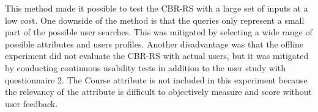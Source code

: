 This method made it possible to test the CBR-RS with a large set of inputs at a low cost. One downside of the method is that the queries only represent a small part of the possible user searches. This was mitigated by selecting a wide range of possible attributes and users profiles. Another disadvantage was that the offline experiment did not evaluate the CBR-RS with actual users, but it was mitigated by conducting continuous usability tests in addition to the user study with questionnaire 2. The Course attribute is not included in this experiment because the relevancy of the attribute is difficult to objectively measure and score without user feedback.


\begin{table}[h]
\centering
{}
\end{table}
